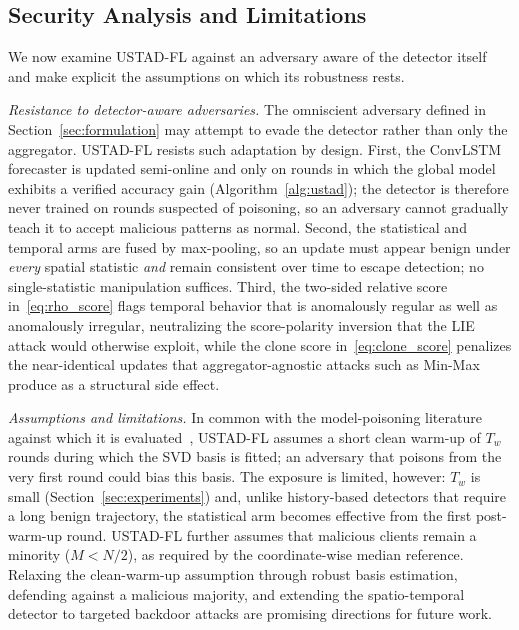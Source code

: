 \documentclass[journal]{IEEEtran}
\begin{document}
\subsection{Security Analysis and Limitations}
We now examine USTAD-FL against an adversary aware of the detector itself and make explicit the assumptions on which its robustness rests.

\noindent\textit{Resistance to detector-aware adversaries.} The omniscient adversary defined in Section~\ref{sec:formulation} may attempt to evade the detector rather than only the aggregator. USTAD-FL resists such adaptation by design. First, the ConvLSTM forecaster is updated semi-online and only on rounds in which the global model exhibits a verified accuracy gain (Algorithm~\ref{alg:ustad}); the detector is therefore never trained on rounds suspected of poisoning, so an adversary cannot gradually teach it to accept malicious patterns as normal. Second, the statistical and temporal arms are fused by max-pooling, so an update must appear benign under \emph{every} spatial statistic \emph{and} remain consistent over time to escape detection; no single-statistic manipulation suffices. Third, the two-sided relative score in~\eqref{eq:rho_score} flags temporal behavior that is anomalously regular as well as anomalously irregular, neutralizing the score-polarity inversion that the LIE attack would otherwise exploit, while the clone score in~\eqref{eq:clone_score} penalizes the near-identical updates that aggregator-agnostic attacks such as Min-Max produce as a structural side effect.

\noindent\textit{Assumptions and limitations.} In common with the model-poisoning literature against which it is evaluated~\cite{baruch2019little, shejwalkar2021manipulating}, USTAD-FL assumes a short clean warm-up of $T_w$ rounds during which the SVD basis is fitted; an adversary that poisons from the very first round could bias this basis. The exposure is limited, however: $T_w$ is small (Section~\ref{sec:experiments}) and, unlike history-based detectors that require a long benign trajectory, the statistical arm becomes effective from the first post-warm-up round. USTAD-FL further assumes that malicious clients remain a minority ($M < N/2$), as required by the coordinate-wise median reference. Relaxing the clean-warm-up assumption through robust basis estimation, defending against a malicious majority, and extending the spatio-temporal detector to targeted backdoor attacks are promising directions for future work.

\end{document}

